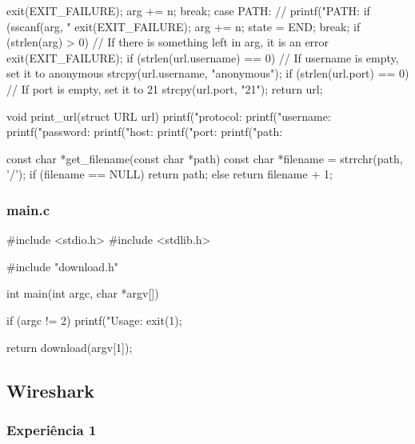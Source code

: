 \documentclass[11pt,a4paper,twocolumn]{article}
\begin{document}
\begin{c-darktheme}
{{{{                exit(EXIT_FAILURE);
            }
            arg += n;
            break;
        case PATH:
            // printf("PATH: %
            if (sscanf(arg, "%
            {
                exit(EXIT_FAILURE);
            }
            arg += n;
            state = END;
            break;
        }
    }
    if (strlen(arg) > 0) // If there is something left in arg, it is an error
    {
        exit(EXIT_FAILURE);
    }
    if (strlen(url.username) == 0) // If username is empty, set it to anonymous
    {
        strcpy(url.username, "anonymous");
    }
    if (strlen(url.port) == 0) // If port is empty, set it to 21
    {
        strcpy(url.port, "21");
    }
    return url;
}

void print_url(struct URL url)
{
    printf("protocol: %
    printf("username: %
    printf("password: %
    printf("host: %
    printf("port: %
    printf("path: %
}

const char *get_filename(const char *path)
{
    const char *filename = strrchr(path, '/');
    if (filename == NULL)
    {
        return path;
    }
    else
    {
        return filename + 1;
    }
}

\end{c-darktheme}

\subsubsection{main.c}
\begin{c-darktheme}
    #include <stdio.h>
#include <stdlib.h>

#include "download.h"

int main(int argc, char *argv[])
{
    if (argc != 2)
    {
        printf("Usage: %
        exit(1);
    }

    return download(argv[1]);
}
\end{c-darktheme}


\subsection{Wireshark}

\subsubsection{Experiência 1}
\end{document}
